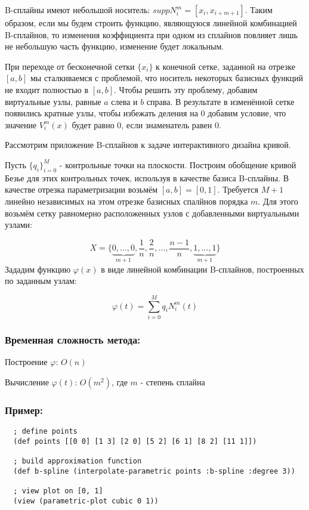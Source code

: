 B-сплайны имеют небольшой носитель: $supp N^m_i = [x_i, x_{i+m+1}]$. Таким образом, если мы будем строить функцию, являющуюся линейной комбинацией B-сплайнов, то изменения коэффициента при одном из сплайнов повлияет лишь не небольшую часть функцию, изменение будет локальным.

При переходе от бесконечной сетки $\{x_i\}$ к конечной сетке, заданной на отрезке $[a, b]$ мы сталкиваемся с проблемой, что носитель некоторых базисных функций не входит полностью в $[a, b]$. Чтобы решить эту проблему, добавим виртуальные узлы, равные $a$ слева и $b$ справа. В результате в изменённой сетке появились кратные узлы, чтобы избежать деления на 0 добавим условие, что значение $V^m_i(x)$ будет равно $0$, если знаменатель равен 0.

Рассмотрим приложение B-сплайнов к задаче интерактивного дизайна кривой.

Пусть $\{q_i\}^M_{i=0}$ - контрольные точки на плоскости. Построим обобщение кривой Безье для этих контрольных точек, используя в качестве базиса B-сплайны. В качестве отрезка параметризации возьмём $[a, b] = [0, 1]$. Требуется $M + 1$ линейно независимых на этом отрезке базисных спалйнов порядка $m$. Для этого возьмём сетку равномерно расположенных узлов с добавленными виртуальными узлами:

\begin{equation}
  X = \{\underbrace{0, \ldots, 0}_{m+1}, \frac{1}{n},\frac{2}{n}, \ldots, \frac{n-1}{n}, \underbrace{1, \ldots, 1}_{m+1}\}
\end{equation}
Зададим функцию $\varphi(x)$ в виде линейной комбинации B-сплайнов, построенных по заданным узлам:

\begin{equation}
  \varphi(t) = \sum_{i=0}^M q_i N^m_i(t)
\end{equation}

\subsubsection{Временная сложность метода:}

Построение $\varphi$: $O(n)$

Вычисление $\varphi(t)$: $O(m^2)$, где $m$ - степень сплайна


\subsubsection{Пример:}

\begin{verbatim}
  ; define points
  (def points [[0 0] [1 3] [2 0] [5 2] [6 1] [8 2] [11 1]])

  ; build approximation function
  (def b-spline (interpolate-parametric points :b-spline :degree 3))

  ; view plot on [0, 1]
  (view (parametric-plot cubic 0 1))
\end{verbatim}

